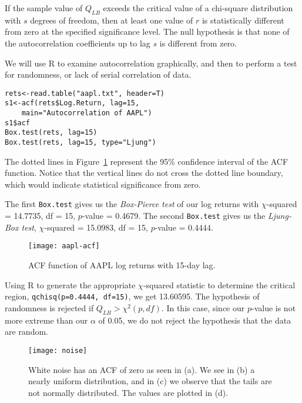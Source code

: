 If the sample value of $Q_{LB}$ exceeds the critical value of a chi-square distribution with $s$ degrees of freedom, then at least one value of $r$ is statistically different from zero at the specified significance level. The null hypothesis is that none of the autocorrelation coefficients up to lag $s$ is different from zero.

We will use R to examine autocorrelation graphically, and then to perform a test for randomness, or lack of serial correlation of data.
\begin{verbatim}
rets<-read.table("aapl.txt", header=T)
s1<-acf(rets$Log.Return, lag=15,
    main="Autocorrelation of AAPL")
s1$acf
Box.test(rets, lag=15)
Box.test(rets, lag=15, type="Ljung")
\end{verbatim}

The dotted lines in Figure~\ref{figure:aapl-acf} represent the 95\% confidence interval of the ACF function. Notice that the vertical lines do not cross the dotted line boundary, which would indicate statistical significance from zero.

The first \texttt{Box.test} gives us the \emph{Box-Pierce test} of our log returns with $\chi$-squared = 14.7735, df = 15, $p$-value = 0.4679. The second \texttt{Box.test} gives us the \emph{Ljung-Box test}, $\chi$-squared = 15.0983, df = 15, $p$-value = 0.4444.

\begin{figure}[tb]
  \centering
  \texttt{[image: aapl-acf]}
  \caption{ACF function of AAPL log returns with 15-day lag.}
  \label{figure:aapl-acf}
\end{figure}

Using R to generate the appropriate $\chi$-squared statistic to determine the critical region, \texttt{qchisq(p=0.4444, df=15)}, we get 13.60595. The hypothesis of randomness is rejected if $Q_{LB} > \chi^2(p, df)$. In this case, since our $p$-value is not more extreme than our $\alpha$ of 0.05, we do not reject the hypothesis that the data are random.

\begin{figure}[tb]
  \centering
  \texttt{[image: noise]}
  \caption[Properties of White Noise]{White noise has an ACF of zero as seen in (a). We see in (b) a nearly uniform distribution, and in (c) we observe that the tails are not normally distributed. The values are plotted in (d).}
  \label{figure:noise}
\end{figure}

